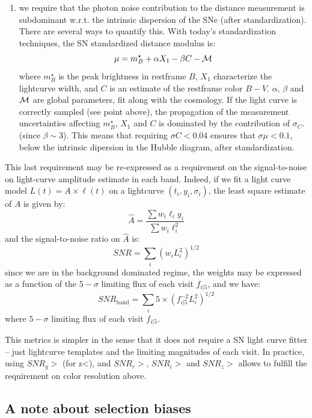 \documentclass [11pt,a4paper]{article}
\begin{document}
\begin{enumerate}
\item we require that the photon noise contribution to the distance
  measurement is subdominant w.r.t. the intrinsic dispersion of the
  SNe (after standardization).  There are several ways to quantify
  this.  With today's standardization techniques, the SN standardized
  distance modulus is:
  \begin{equation}
    \mu = m^\star_B + \alpha X_1 - \beta C - \cal{M}
  \end{equation}
  where $m^\star_B$ is the peak brightness in restframe $B$, $X_1$
  characterize the lightcurve width, and $C$ is an estimate of the
  restframe color $B-V$. $\alpha$, $\beta$ and $\cal{M}$ are global
  parameters, fit along with the cosmology. If the light curve is
  correctly sampled (see point above), the propagation of the
  measurement uncertainties affecting $m^\star_B$, $X_1$ and $C$ is
  dominated by the contribution of $\sigma_C$. (since $\beta \sim
  3$). This means that requiring $\sigma C < 0.04$ ensures that
  $\sigma \mu < 0.1$, below the intrinsic dipersion in the Hubble
  diagram, after standardization.
\end{enumerate}

This last requirement may be re-expressed as a requirement on the
signal-to-noise on light-curve amplitude estimate in each
band. Indeed, if we fit a light curve model $L(t) = A \times \ell(t)$
on a lightcurve $(t_i, y_i, \sigma_i)$, the least square estimate of
$A$ is given by:
$$
\hat{A} = \frac{\sum w_i \ell_i y_i}{\sum w_i \ell_i^2}
$$
and the signal-to-noise ratio on $\hat{A}$ is:
$$
SNR = \sum_i (w_i L_i^2)^{1/2}
$$ since we are in the background dominated regime, the weights may be
expressed as a function of the $5-\sigma$ limiting flux of each visit
$f_{i|5}$, and we have:
$$
SNR_{\mathrm{band}} = \sum_{i} 5 \times (f^{-2}_{i|5} L_i^2)^{1/2}
$$
where $5-\sigma$ limiting flux of each visit $f_{i|5}$.

This metrics is simpler in the sense that it does not require a SN
light curve fitter -- just lightcurve templates and the limiting
magnitudes of each visit. In practice, using $SNR_g > $ (for z<), and
$SNR_r > $, $SNR_i > $ and $SNR_z > $ allows to fulfill the
requirement on color resolution above.


\subsection{A note about selection biases}
\end{document}

